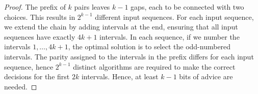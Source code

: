 \documentclass[reqno,11pt]{article} %
\theoremstyle{remark}
\begin{document}
\begin{proof} 
    The prefix of $k$ pairs leaves $k-1$ gaps, each to be connected with two choices. This results in $2^{k-1}$ different input sequences. For each input sequence, we extend the chain by adding intervals at the end, ensuring that all input sequences have exactly $4k+1$ intervals. 
    In each sequence, if we number the intervals $1, \ldots, 4k+1$, the optimal solution is to select the odd-numbered intervals. The parity assigned to the intervals in the prefix differs for each input sequence, hence $2^{k-1}$ distinct algorithms are required to make the correct decisions for the first $2k$ intervals. Hence, at least $k-1$ bits of advice are needed.
\end{proof}





{}

\end{document}
